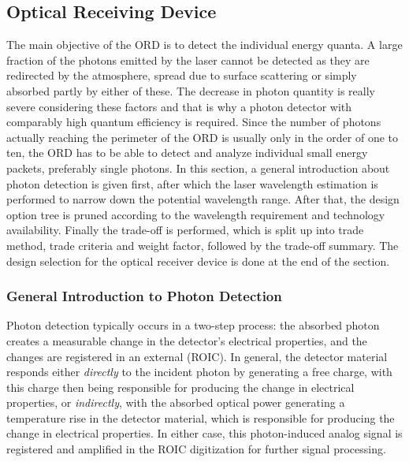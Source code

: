\subsection{Optical Receiving Device}
\label{TOORD}
The main objective of the \ac{ORD} is to detect the individual energy quanta. A large fraction of the photons emitted by the \acs{laser} cannot be detected as they are redirected by the atmosphere, spread due to surface scattering or simply absorbed partly by either of these. The decrease in photon quantity is really severe considering these factors and that is why a photon detector with comparably high quantum efficiency is required. Since the number of photons actually reaching the perimeter of the \ac{ORD} is usually only in the order of one to ten, the \acs{ORD} has to be able to detect and analyze individual small energy packets, preferably single photons. In this section, a general introduction about photon detection is given first, after which the \acs{laser} wavelength estimation is performed to narrow down the potential wavelength range. After that, the design option tree is pruned according to the wavelength requirement and technology availability. Finally the trade-off is performed, which is split up into trade method, trade criteria and weight factor, followed by the trade-off summary. The design selection for the optical receiver device is done at the end of the section.

\subsubsection{General Introduction to Photon Detection}
\label{introReceiver}
Photon detection typically occurs in a two-step process: the absorbed photon creates a measurable change in the detector's electrical properties, and the changes are registered in an external (\acl{ROIC}). In general, the detector material responds either \textit{directly} to the incident photon by generating a free charge, with this charge then being responsible for producing the change in electrical properties, or \textit{indirectly}, with the absorbed optical power generating a temperature rise in the detector material, which is responsible for producing the change in electrical properties. In either case, this photon-induced analog signal is registered and amplified in the \acs{ROIC} digitization for further signal processing. 

